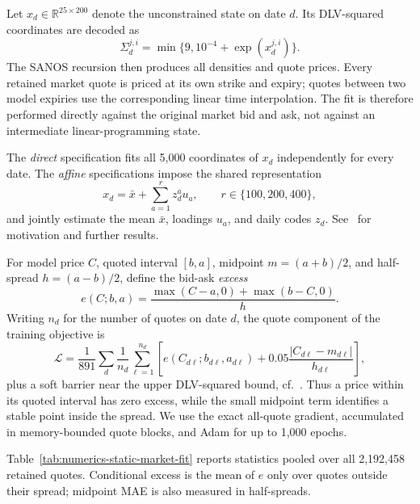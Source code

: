 \documentclass[11pt]{article}
\newcommand{\abs}[1]{\lvert #1\rvert}
\theoremstyle{plain}
\theoremstyle{definition}
\theoremstyle{remark}
\begin{document}
Let $x_d\in\mathbb R^{25\times200}$ denote the unconstrained state on date
$d$. Its DLV-squared coordinates are decoded as
\[
  \Sigma_d^{j,i}=\min\{9,10^{-4}+\exp(x_d^{j,i})\}.
\]
The SANOS recursion then produces all densities and quote prices. Every
retained market quote is priced at its own strike and expiry; quotes between
two model expiries use the corresponding linear time interpolation. The fit is
therefore performed directly against the original market bid and ask, not
against an intermediate linear-programming state.

The \emph{direct} specification fits all 5,000 coordinates of $x_d$
independently for every date. The \emph{affine} specifications impose
the shared representation
\begin{equation}
  \label{eq:estimation-affine-state}
  x_d=\bar x+\sum_{a=1}^r z_d^a u_a,
  \qquad r\in\{100,200,400\},
\end{equation}
and jointly estimate the mean $\bar x$, loadings $u_a$, and daily codes $z_d$. See~\cite{DYSANOS2026}
for motivation and further results.

For model price $C$, quoted interval $[b,a]$, midpoint $m=(a+b)/2$, and
half-spread $h=(a-b)/2$, define the bid-ask \emph{excess}
\begin{equation}\label{eq:excess}
  e(C;b,a)=\frac{\max(C-a,0)+\max(b-C,0)}{h}.
\end{equation}
Writing $n_d$ for the number of quotes on date $d$, the quote component of the
training objective is
\begin{equation}
  \label{eq:estimation-quote-objective}
  \mathcal L
  =\frac1{891}\sum_d\frac1{n_d}\sum_{\ell=1}^{n_d}
    \left[
      e(C_{d\ell};b_{d\ell},a_{d\ell})
      +0.05\frac{\abs{C_{d\ell}-m_{d\ell}}}{h_{d\ell}}
    \right],
\end{equation}
plus a soft barrier near the upper DLV-squared bound, cf.~\cite{DYSANOS2026}. Thus a price within its
quoted interval has zero excess, while the small midpoint term identifies a
stable point inside the spread. We use the exact all-quote gradient, accumulated
in memory-bounded quote blocks, and Adam for up to 1,000 epochs.

Table~\ref{tab:numerics-static-market-fit} reports statistics pooled over all
2,192,458 retained quotes. Conditional excess is the mean of $e$ only over
quotes outside their spread; midpoint MAE is also measured in half-spreads.
\end{document}
